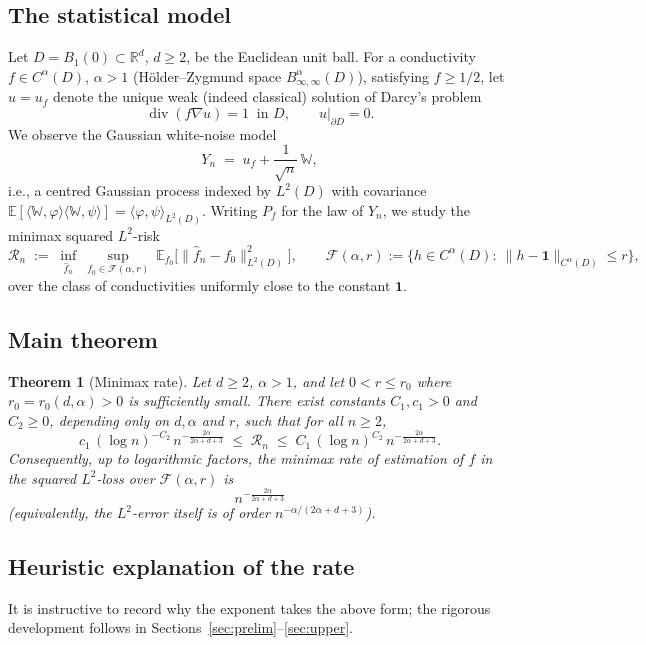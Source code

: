 \documentclass[11pt]{amsart}
\newtheorem{theorem}{Theorem}[section]
\newcommand{\R}{\mathbb{R}}
\newcommand{\E}{\mathbb{E}}
\newcommand{\W}{\mathbb{W}}
\newcommand{\1}{\mathbf{1}}
\newcommand{\F}{\mathcal{F}}
\newcommand{\divop}{\operatorname{div}}
\begin{document}
\subsection{The statistical model}
Let $D=B_1(0)\subset\R^d$, $d\ge2$, be the Euclidean unit ball. For a
conductivity $f\in C^\alpha(D)$, $\alpha>1$ (H\"older--Zygmund space
$B^\alpha_{\infty,\infty}(D)$), satisfying $f\ge 1/2$, let $u=u_f$ denote the
unique weak (indeed classical) solution of Darcy's problem
\begin{equation}\label{eq:pde}
\divop(f\nabla u)=1\ \text{ in }D,\qquad u|_{\partial D}=0 .
\end{equation}
We observe the Gaussian white-noise model
\begin{equation}\label{eq:model}
Y_n \;=\; u_f+\frac1{\sqrt n}\,\W ,
\end{equation}
i.e., a centred Gaussian process indexed by $L^2(D)$ with covariance
$\E[\langle \W,\varphi\rangle\langle \W,\psi\rangle]=\langle\varphi,\psi\rangle_{L^2(D)}$.
Writing $P_f$ for the law of $Y_n$, we study the minimax squared $L^2$-risk
\[
\mathcal R_n\;:=\;\inf_{\hat f_n}\ \sup_{f_0\in\F(\alpha,r)}\
\E_{f_0}\big[\|\hat f_n-f_0\|^2_{L^2(D)}\big],
\qquad
\F(\alpha,r):=\Big\{h\in C^\alpha(D):\ \|h-\1\|_{C^\alpha(D)}\le r\Big\},
\]
over the class of conductivities uniformly close to the constant $\1$.

\subsection{Main theorem}

\begin{theorem}[Minimax rate]\label{thm:main}
Let $d\ge2$, $\alpha>1$, and let $0<r\le r_0$ where $r_0=r_0(d,\alpha)>0$ is
sufficiently small. There exist constants $C_1,c_1>0$ and $C_2\ge0$, depending
only on $d,\alpha$ and $r$, such that for all $n\ge2$,
\[
c_1\,(\log n)^{-C_2}\, n^{-\frac{2\alpha}{2\alpha+d+3}}
\;\le\;
\mathcal R_n
\;\le\;
C_1\,(\log n)^{C_2}\, n^{-\frac{2\alpha}{2\alpha+d+3}} .
\]
Consequently, up to logarithmic factors, the minimax rate of estimation of $f$
in the squared $L^2$-loss over $\F(\alpha,r)$ is
\begin{equation}\label{eq:rate}
\boxed{\ n^{-\frac{2\alpha}{2\alpha+d+3}}\ }
\end{equation}
(equivalently, the $L^2$-error itself is of order
$n^{-\alpha/(2\alpha+d+3)}$).
\end{theorem}

\subsection{Heuristic explanation of the rate}\label{sec:heuristic}
It is instructive to record why the exponent takes the above form; the
rigorous development follows in Sections~\ref{sec:prelim}--\ref{sec:upper}.
\end{document}
